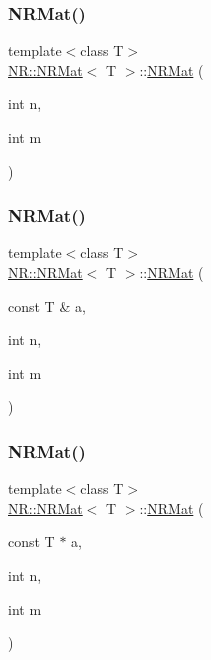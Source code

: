 \mbox{\label{classNR_1_1NRMat_a52799868d76fb74a2d73b8d8291a9215}} 
\subsubsection{\texorpdfstring{NRMat()}{NRMat()}\hspace{0.1cm}{\footnotesize\ttfamily [7/15]}}
{\footnotesize\ttfamily template$<$class T$>$ \\
\mbox{\hyperlink{classNR_1_1NRMat}{N\+R\+::\+N\+R\+Mat}}$<$ T $>$\+::\mbox{\hyperlink{classNR_1_1NRMat}{N\+R\+Mat}} (\begin{DoxyParamCaption}\item[{int}]{n,  }\item[{int}]{m }\end{DoxyParamCaption})}

\mbox{\label{classNR_1_1NRMat_a31a0ecf81920c576b25e3c49bfa5e444}} 
\subsubsection{\texorpdfstring{NRMat()}{NRMat()}\hspace{0.1cm}{\footnotesize\ttfamily [8/15]}}
{\footnotesize\ttfamily template$<$class T$>$ \\
\mbox{\hyperlink{classNR_1_1NRMat}{N\+R\+::\+N\+R\+Mat}}$<$ T $>$\+::\mbox{\hyperlink{classNR_1_1NRMat}{N\+R\+Mat}} (\begin{DoxyParamCaption}\item[{const T \&}]{a,  }\item[{int}]{n,  }\item[{int}]{m }\end{DoxyParamCaption})}

\mbox{\label{classNR_1_1NRMat_a30ddcc485a9e735b1fafbb56022fdc3a}} 
\subsubsection{\texorpdfstring{NRMat()}{NRMat()}\hspace{0.1cm}{\footnotesize\ttfamily [9/15]}}
{\footnotesize\ttfamily template$<$class T$>$ \\
\mbox{\hyperlink{classNR_1_1NRMat}{N\+R\+::\+N\+R\+Mat}}$<$ T $>$\+::\mbox{\hyperlink{classNR_1_1NRMat}{N\+R\+Mat}} (\begin{DoxyParamCaption}\item[{const T $\ast$}]{a,  }\item[{int}]{n,  }\item[{int}]{m }\end{DoxyParamCaption})}

